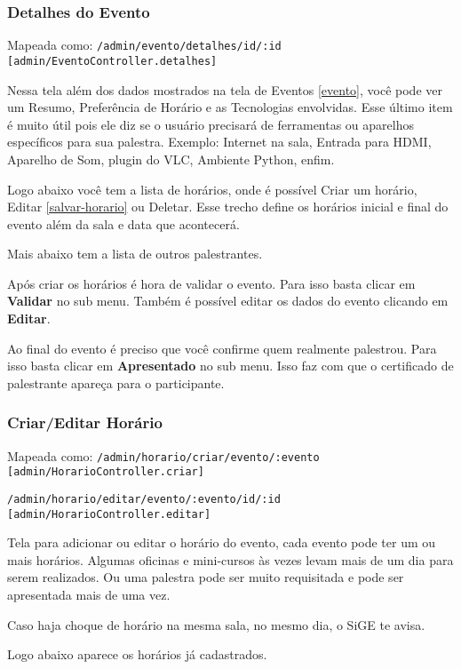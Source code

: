 \subsubsection{Detalhes do Evento \label{detalhes-evento}}

Mapeada como:
\texttt{/admin/evento/detalhes/id/:id {[}admin/EventoController.detalhes{]}}

Nessa tela além dos dados mostrados na tela de Eventos \ref{evento},
você pode ver um Resumo, Preferência de Horário e as Tecnologias
envolvidas. Esse último item é muito útil pois ele diz se o usuário
precisará de ferramentas ou aparelhos específicos para sua palestra.
Exemplo: Internet na sala, Entrada para HDMI, Aparelho de Som, plugin do
VLC, Ambiente Python, enfim.

Logo abaixo você tem a lista de horários, onde é possível Criar um
horário, Editar \ref{salvar-horario} ou Deletar. Esse trecho define os
horários inicial e final do evento além da sala e data que acontecerá.

Mais abaixo tem a lista de outros palestrantes.

Após criar os horários é hora de validar o evento. Para isso basta
clicar em \textbf{Validar} no sub menu. Também é possível editar os
dados do evento clicando em \textbf{Editar}.

Ao final do evento é preciso que você confirme quem realmente palestrou.
Para isso basta clicar em \textbf{Apresentado} no sub menu. Isso faz com
que o certificado de palestrante apareça para o participante.

\subsubsection{Criar/Editar Horário \label{salvar-horario}}

Mapeada como:
\texttt{/admin/horario/criar/evento/:evento {[}admin/HorarioController.criar{]}}

\texttt{/admin/horario/editar/evento/:evento/id/:id {[}admin/HorarioController.editar{]}}

Tela para adicionar ou editar o horário do evento, cada evento pode ter
um ou mais horários. Algumas oficinas e mini-cursos às vezes levam mais
de um dia para serem realizados. Ou uma palestra pode ser muito
requisitada e pode ser apresentada mais de uma vez.

Caso haja choque de horário na mesma sala, no mesmo dia, o SiGE te
avisa.

Logo abaixo aparece os horários já cadastrados.

